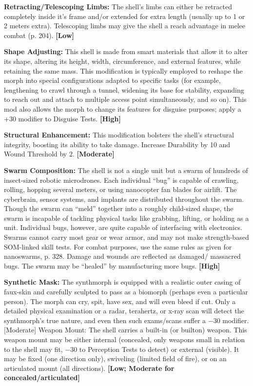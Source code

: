 \textbf{Retracting/Telescoping Limbs:} The shell’s limbs can either be retracted completely inside it’s frame and/or extended for extra length (usually up to 1 or 2 meters extra). Telescoping limbs may give the shell a reach advantage in melee combat (p. 204). \textbf{[Low]} 

\textbf{Shape Adjusting:} This shell is made from smart materials that allow it to alter its shape, altering its height, width, circumference, and external features, while retaining the same mass. This modification is typically employed to reshape the morph into special configurations adapted to specific tasks (for example, lengthening to crawl through a tunnel, widening its base for stability, expanding to reach out and attach to multiple access point simultaneously, and so on). This mod also allows the morph to change its features for disguise purposes; apply a +30 modifier to Disguise Tests. \textbf{[High]} 

\textbf{Structural Enhancement:} This modification bolsters the shell’s structural integrity, boosting its ability to take damage. Increase Durability by 10 and Wound Threshold by 2. \textbf{[Moderate]} 

\textbf{Swarm Composition:} The shell is not a single unit but a swarm of hundreds of insect-sized robotic microdrones. Each individual ``bug'' is capable of crawling, rolling, hopping several meters, or using nanocopter fan blades for airlift. The cyberbrain, sensor systems, and implants are distributed throughout the swarm. Though the swarm can ``meld'' together into a roughly child-sized shape, the swarm is incapable of tackling physical tasks like grabbing, lifting, or holding as a unit. Individual bugs, however, are quite capable of interfacing with electronics. Swarms cannot carry most gear or wear armor, and may not make strength-based SOM-linked skill tests. For combat purposes, use the same rules as given for nanoswarms, p. 328. Damage and wounds are reflected as damaged/ massacred bugs. The swarm may be ``healed'' by manufacturing more bugs. \textbf{[High]} 

\textbf{Synthetic Mask:} The synthmorph is equipped with a realistic outer casing of faux-skin and carefully sculpted to pass as a biomorph (perhaps even a particular person). The morph can cry, spit, have sex, and will even bleed if cut. Only a detailed physical examination or a radar, terahertz, or x-ray scan will detect the synthmorph’s true nature, and even then such exams/scans suffer a $-$30 modifier. [Moderate] Weapon Mount: The shell carries a built-in (or builton) weapon. This weapon mount may be either internal (concealed, only weapons small in relation to the shell may fit, $-$30 to Perception Tests to detect) or external (visible). It may be fixed (one direction only), swiveling (limited field of fire), or on an articulated mount (all directions). \textbf{[Low; Moderate for concealed/articulated]} 

